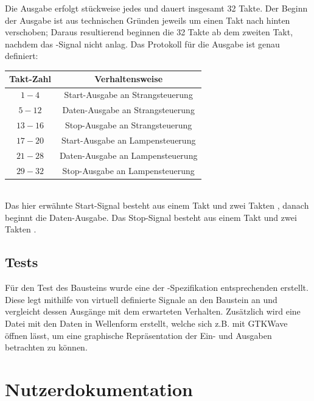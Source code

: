 \documentclass[a4paper]{article}
\begin{document}
            \noindent Die Ausgabe erfolgt stückweise jedes  und dauert insgesamt 32 Takte. 
            Der Beginn der Ausgabe ist aus technischen Gründen jeweils um einen Takt nach hinten verschoben; Daraus resultierend beginnen die 32 Takte ab dem zweiten Takt, nachdem das -Signal nicht anlag.
             Das Protokoll für die Ausgabe ist genau definiert:

            \begin{tabular}{c | c}\label{protokoll}
                Takt-Zahl  & Verhaltensweise \\
                \hline
                $1-4$   & Start-Ausgabe an Strangsteuerung \\
                $5-12$  & Daten-Ausgabe an Strangsteuerung\\
                $13-16$ & Stop-Ausgabe an Strangsteuerung\\
                \hline
                $17-20$   & Start-Ausgabe an Lampensteuerung\\
                $21-28$  & Daten-Ausgabe an Lampensteuerung\\
                $29-32$ & Stop-Ausgabe an Lampensteuerung\\
              \end{tabular}\\

              Das hier erwähnte Start-Signal besteht aus einem Takt  und zwei Takten , 
              danach beginnt die Daten-Ausgabe. 
              Das Stop-Signal besteht aus einem Takt  und zwei Takten .
        \subsection{Tests}
            Für den Test des Bausteins wurde eine der -Spezifikation entsprechenden  erstellt.
            Diese legt mithilfe von  virtuell definierte Signale an den Baustein an und vergleicht dessen Ausgänge mit dem erwarteten Verhalten.
            Zusätzlich wird eine Datei mit den Daten in Wellenform erstellt, 
            welche sich z.B. mit GTKWave öffnen lässt, um eine graphische Repräsentation der Ein- und Ausgaben betrachten zu können.
   
\section{Nutzerdokumentation}
\end{document}
